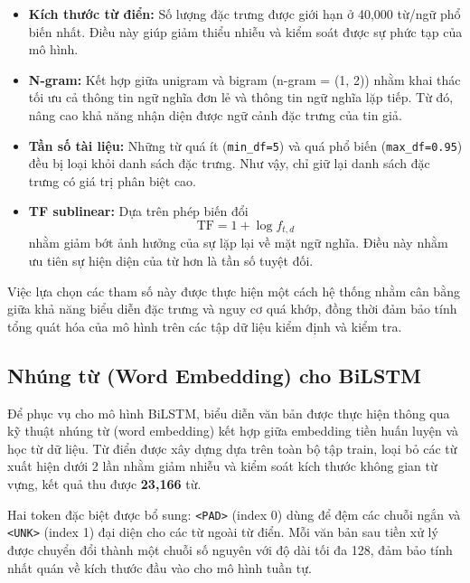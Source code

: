 \documentclass[12pt, a4paper]{report}
\newcommand{\tfidfMaxFeatures}{40,000}
\newcommand{\bilstmVocab}{23,166}
\newcommand{\bilstmMaxSeq}{128}
\begin{document}
\begin{itemize}[leftmargin=2em]

  \item \textbf{Kích thước từ điển:}
  Số lượng đặc trưng được giới hạn ở \tfidfMaxFeatures{} từ/ngữ phổ
  biến nhất. Điều này giúp giảm thiểu nhiễu và kiểm soát được sự phức tạp
  của mô hình.

  \item \textbf{N-gram:}
  Kết hợp giữa unigram và bigram (n-gram = (1, 2)) nhằm khai thác tối
  ưu cả thông tin ngữ nghĩa đơn lẻ và thông tin ngữ nghĩa lặp tiếp. Từ đó,
  nâng cao khả năng nhận diện được ngữ cảnh đặc trưng của tin giả.

  \item \textbf{Tần số tài liệu:}
  Những từ quá ít (\texttt{min\_df=5}) và quá phổ biến (\texttt{max\_df=0.95})
  đều bị loại khỏi danh sách đặc trưng. Như vậy, chỉ giữ lại danh sách đặc
  trưng có giá trị phân biệt cao.

  \item \textbf{TF sublinear:}
  Dựa trên phép biến đổi \[\text{TF} = 1 + \log f_{t,d}\] nhằm giảm bớt
  ảnh hưởng của sự lặp lại về mặt ngữ nghĩa. Điều này nhằm ưu tiên sự hiện
  diện của từ hơn là tần số tuyệt đối.

\end{itemize}

Việc lựa chọn các tham số này được thực hiện một cách hệ thống nhằm cân
bằng giữa khả năng biểu diễn đặc trưng và nguy cơ quá khớp, đồng thời
đảm bảo tính tổng quát hóa của mô hình trên các tập dữ liệu kiểm định
và kiểm tra.

\subsection{Nhúng từ (Word Embedding) cho BiLSTM}

Để phục vụ cho mô hình BiLSTM, biểu diễn văn bản được thực hiện thông qua kỹ thuật nhúng từ (word embedding) kết hợp giữa embedding tiền huấn luyện và học từ dữ liệu. Từ điển được xây dựng dựa trên toàn bộ tập train, loại bỏ các từ xuất hiện dưới 2 lần nhằm giảm nhiễu và kiểm soát kích thước không gian từ vựng, kết quả thu được \textbf{\bilstmVocab{}} từ.

Hai token đặc biệt được bổ sung: \texttt{<PAD>} (index 0) dùng để đệm các chuỗi ngắn và \texttt{<UNK>} (index 1) đại diện cho các từ ngoài từ điển. Mỗi văn bản sau tiền xử lý được chuyển đổi thành một chuỗi số nguyên với độ dài tối đa \bilstmMaxSeq, đảm bảo tính nhất quán về kích thước đầu vào cho mô hình tuần tự.
\end{document}
